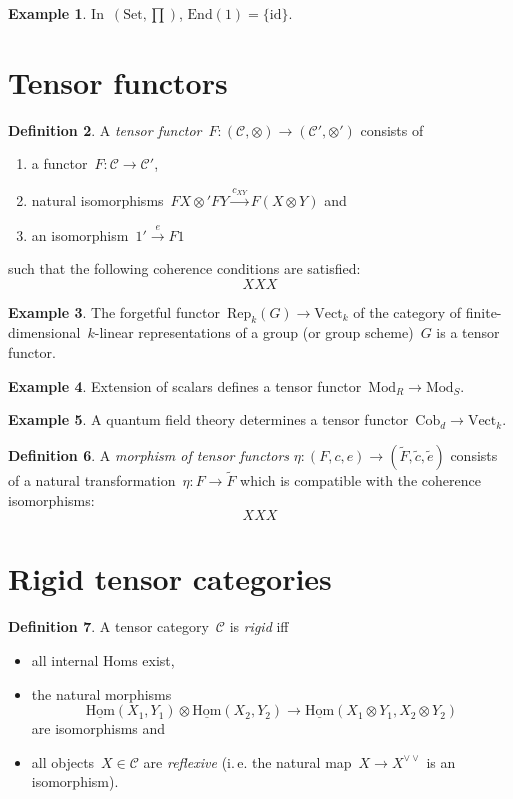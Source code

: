 \documentclass[a4paper,english,12pt]{scrartcl}
\theoremstyle{definition}
\newtheorem{defn}{Definition}[section]
\newtheorem{ex}[defn]{Example}
\theoremstyle{plain}
\theoremstyle{remark}
\newcommand{\C}{\mathcal{C}}
\newcommand{\id}{\mathrm{id}}
\newcommand{\xra}[1]{\xrightarrow{#1}}
\renewcommand{\_}{\mathpunct{.}\,}
\newcommand{\?}{\,{:}\,}
\newcommand{\Mod}{\mathrm{Mod}}
\newcommand{\Set}{\mathrm{Set}}
\newcommand{\Vect}{\mathrm{Vect}}
\newcommand{\Hom}{\underline{\mathrm{Hom}}}
\newcommand{\End}{\mathrm{End}}
\newcommand{\Rep}{\mathrm{Rep}}
\newcommand{\Cob}{\mathrm{Cob}}
\begin{document}
\begin{ex}In~$(\Set,\prod)$, $\End(1) = \{\id\}$.\end{ex}


\section{Tensor functors}

\begin{defn}A \emph{tensor functor}~$F : (\C,\otimes) \to (\C',\otimes')$
consists of
\begin{enumerate}
\item a functor~$F : \C \to \C'$,
\item natural isomorphisms~$FX \otimes' FY \xra{c_{XY}} F(X \otimes Y)$ and
\item an isomorphism~$1' \xra{e} F1$
\end{enumerate}
such that the following coherence conditions are satisfied:
\[ XXX \]
\end{defn}

\begin{ex}The forgetful functor~$\Rep_k(G) \to \Vect_k$ of the category
of finite-dimensional~$k$-linear representations of a group (or group
scheme)~$G$ is a tensor functor.\end{ex}

\begin{ex}Extension of scalars defines a tensor functor~$\Mod_R \to
\Mod_S$.\end{ex}

\begin{ex}A quantum field theory determines a tensor functor~$\Cob_d \to
\Vect_k$.\end{ex}

\begin{defn}A \emph{morphism of tensor functors} $\eta : (F,c,e) \to
(\tilde F,\tilde c,\tilde e)$ consists of a natural transformation~$\eta : F \to
\tilde F$ which is compatible with the coherence isomorphisms:
\[ XXX \]
\end{defn}


\section{Rigid tensor categories}

\begin{defn}A tensor category~$\C$ is \emph{rigid} iff
\begin{itemize}
\item all internal Homs exist,
\item the natural morphisms
\[ \Hom(X_1,Y_1) \otimes \Hom(X_2,Y_2) \longrightarrow
  \Hom(X_1 \otimes Y_1, X_2 \otimes Y_2) \]
are isomorphisms and
\item all objects~$X \in \C$ are \emph{reflexive} (i.\,e. the natural map~$X
\to X^{\vee\vee}$ is an isomorphism).
\end{itemize}
\end{defn}
\end{document}
